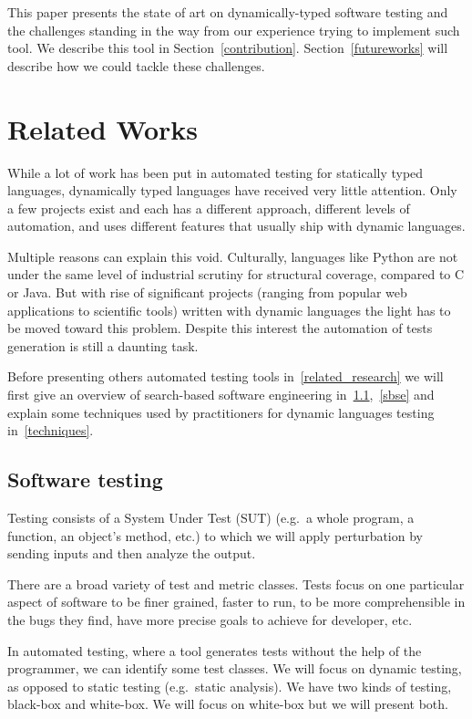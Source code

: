 \documentclass{llncs2e/llncs}
\begin{document}
This paper presents the state of art on dynamically-typed software testing and
the challenges standing in the way from our experience trying to implement such
tool. We describe this tool in Section~\ref{contribution}.
Section~\ref{futureworks} will describe how we could tackle these challenges.


\section{Related Works}
\label{relatedwork}

While a lot of work has been put in automated testing for statically typed
languages, dynamically typed languages have received very little attention. Only
a few projects exist and each has a different approach, different levels of
automation, and uses different features that usually ship with dynamic
languages.

Multiple reasons can explain this void. Culturally, languages like Python are
not under the same level of industrial scrutiny for structural coverage,
compared to C or Java. But with rise of significant projects (ranging from
popular web applications to scientific tools) written with dynamic languages the
light has to be moved toward this problem.  Despite this interest the automation
of tests generation is still a daunting task.

Before presenting others automated testing tools in~\ref{related_research} we
will first give an overview of search-based software engineering in~\ref{st},~\ref{sbse}
and explain some techniques used by practitioners for dynamic languages testing
in~\ref{techniques}.

\subsection{Software testing}
\label{st}

Testing consists of a System Under Test (SUT) (e.g.\ a whole program, a
function, an object's method, etc.) to which we will apply perturbation by
sending inputs and then analyze the output.

There are a broad variety of test and metric classes. Tests focus on one
particular aspect of software to be finer grained, faster to run, to be more
comprehensible in the bugs they find, have more precise goals to achieve for
developer, etc.

In automated testing, where a tool generates tests without the help of the
programmer, we can identify some test classes. We will focus on dynamic testing,
as opposed to static testing (e.g.\ static analysis). We have two kinds of
testing, black-box and white-box. We will focus on white-box but we will present
both.
\end{document}
